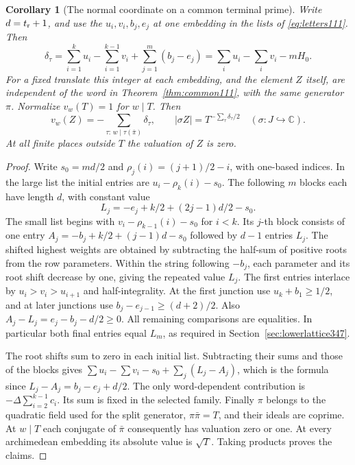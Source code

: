\documentclass[a4paper,11pt]{article}
\newtheorem{corollary}[proposition]{Corollary}
\theoremstyle{definition}
\theoremstyle{remark}
\numberwithin{equation}{section}
\begin{document}
\begin{corollary}[The normal coordinate on a common terminal prime]\leavevmode
\label{cor:normaldegree347}
Write \(d=t_{\rm r}+1\), and use the \(u_i,v_i,b_j,e_j\) at one
embedding in the lists of \eqref{eq:letters111}. Then
\[
 \delta_\tau=\sum_{i=1}^k u_i-\sum_{i=1}^{k-1}v_i
                       +\sum_{j=1}^m (b_j-e_j)
             =\sum_i u_i-\sum_i v_i-mH_0.
\]
For a fixed translate this integer at each embedding, and the element
\(Z\) itself, are independent of the word in
Theorem~\ref{thm:common111}, with the same generator \(\pi\).
Normalize \(v_w(T)=1\) for \(w\mid T\). Then
\[
 v_w(Z)=-\!\sum_{\tau:\,w\mid\tau(\bar\pi)}\delta_\tau ,
 \qquad |\sigma Z|=T^{-\sum_\tau\delta_\tau/2}
 \quad(\sigma:J\hookrightarrow\mathbb C).
\]
At all finite places outside \(T\) the valuation of \(Z\) is zero.
\end{corollary}
\begin{proof}
Write \(s_0=md/2\) and \(\rho_j(i)=(j+1)/2-i\), with one-based
indices. In the large list the initial entries are
\(u_i-\rho_k(i)-s_0\). The following \(m\) blocks each have
length \(d\), with constant value
\[
       L_j=-e_j+k/2+(2j-1)d/2-s_0.
\]
The small list begins with \(v_i-\rho_{k-1}(i)-s_0\) for
\(i<k\). Its \(j\)-th block consists of one entry
\(A_j=-b_j+k/2+(j-1)d-s_0\) followed by \(d-1\) entries
\(L_j\). The shifted highest weights are obtained by subtracting the
half-sum of positive roots from the row parameters. Within the
string following \(-b_j\), each parameter and its root shift
decrease by one, giving the repeated value \(L_j\).
The first entries interlace by \(u_i>v_i>u_{i+1}\) and
half-integrality. At the first junction use
\(u_k+b_1\ge1/2\), and at later junctions use
\(b_j-e_{j-1}\ge(d+2)/2\).
Also \(A_j-L_j=e_j-b_j-d/2\ge0\). All remaining comparisons
are equalities. In particular both final entries equal \(L_m\),
as required in Section~\ref{sec:lowerlattice347}.

The root shifts sum to zero in each initial list. Subtracting
their sums and those of the blocks gives
\(\sum u_i-\sum v_i-s_0+\sum_j(L_j-A_j)\), which is
the formula since \(L_j-A_j=b_j-e_j+d/2\).
The only word-dependent contribution is
\(-\Delta\sum_{i=2}^{k-1}c_i\). Its sum is fixed in the selected
family. Finally \(\pi\) belongs to the quadratic field used for
the split generator, \(\pi\bar\pi=T\), and their ideals are
coprime. At \(w\mid T\) each conjugate of \(\bar\pi\) consequently
has valuation zero or one. At every archimedean embedding its
absolute value is \(\sqrt T\). Taking products proves the claims.
\end{proof}
\end{document}
